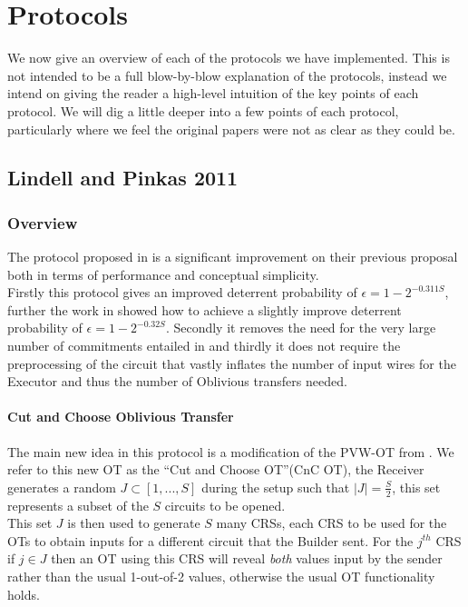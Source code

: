 \documentclass[ %
                    author={Nicholas Tutte},
                supervisor={Prof. Nigel Smart},
                    degree={MEng},
                     title={Secure Two Party Computation},
                  subtitle={A practical comparison of recent protocols},
                      type={Research - GG1K},
                      year={2015} ]{dissertation}
\begin{document}
	\chapter{Protocols} \label{sec:Protocols}
		We now give an overview of each of the protocols we have implemented. This is not intended to be a full blow-by-blow explanation of the protocols, instead we intend on giving the reader a high-level intuition of the key points of each protocol. We will dig a little deeper into a few points of each protocol, particularly where we feel the original papers were not as clear as they could be.

		\section{Lindell and Pinkas 2011}
			\subsection*{Overview}
				The protocol proposed in \cite{LindellAndPinkas2011} is a significant improvement on their previous proposal \cite{LindellAndPinkas2007} both in terms of performance and conceptual simplicity.\\

				Firstly this protocol gives an improved deterrent probability of $\epsilon = 1 - 2^{-0.311 S}$, further the work in \cite{ShelatAndShen} showed how to achieve a slightly improve deterrent probability of $\epsilon = 1 - 2^{-0.32 S}$. Secondly it removes the need for the very large number of commitments entailed in \cite{LindellAndPinkas2007} and thirdly it does not require the preprocessing of the circuit that vastly inflates the number of input wires for the Executor and thus the number of Oblivious transfers needed.

				\subsubsection{Cut and Choose Oblivious Transfer}
					The main new idea in this protocol is a modification of the PVW-OT from \cite{PVW_OT_2008}. We refer to this new OT as the ``Cut and Choose OT''(CnC OT), the Receiver generates a random $J \subset [1, ..., S]$ during the setup such that $\vert J \vert = \frac{S}{2}$, this set represents a subset of the $S$ circuits to be opened.\\

					This set $J$ is then used to generate $S$ many CRSs, each CRS to be used for the OTs to obtain inputs for a different circuit that the Builder sent. For the $j^{th}$ CRS if $j \in J$ then an OT using this CRS will reveal \emph{both} values input by the sender rather than the usual 1-out-of-2 values, otherwise the usual OT functionality holds.\\
\end{document}
